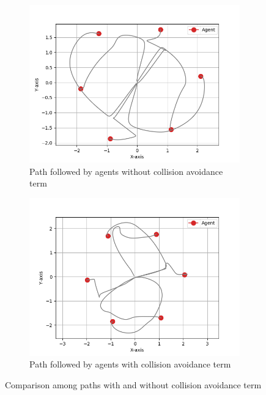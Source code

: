 \documentclass[a4paper,11pt,oneside]{book}
\begin{document}
\begin{figure}[h]
\centering
	\begin{subfigure}{0.49\textwidth}	
	\includegraphics[width=\textwidth]{Hexagon_path.jpg}
	\caption{Path followed by agents without collision avoidance term}
	\end{subfigure}
\hfill
	\begin{subfigure}{0.49\textwidth}	
	\includegraphics[width=\textwidth]{Hexagon_path_collision.jpg}
	\caption{Path followed by agents with collision avoidance term}
	\end{subfigure}
\caption{Comparison among paths with and without collision avoidance term}
\label{Paths_comparison}
\end{figure}
\end{document}
